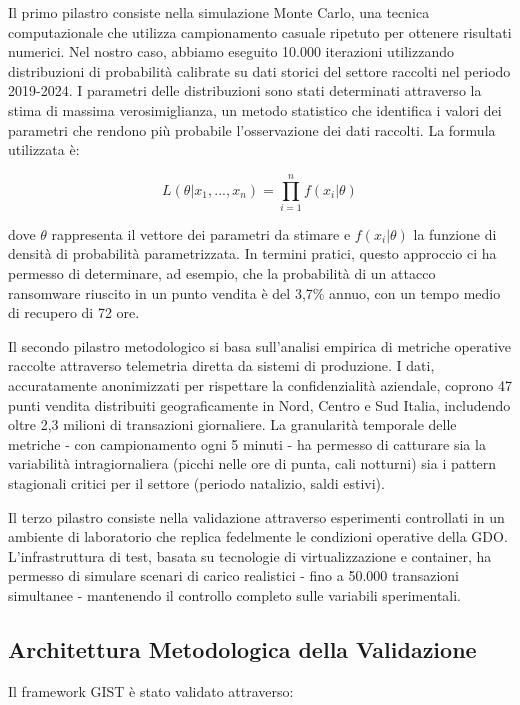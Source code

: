 Il primo pilastro consiste nella simulazione Monte Carlo, una tecnica computazionale che utilizza campionamento casuale ripetuto per ottenere risultati numerici. Nel nostro caso, abbiamo eseguito 10.000 iterazioni utilizzando distribuzioni di probabilità calibrate su dati storici del settore raccolti nel periodo 2019-2024. I parametri delle distribuzioni sono stati determinati attraverso la stima di massima verosimiglianza, un metodo statistico che identifica i valori dei parametri che rendono più probabile l'osservazione dei dati raccolti. La formula utilizzata è:

$$L(\theta|x_1,...,x_n) = \prod_{i=1}^{n} f(x_i|\theta)$$

dove $\theta$ rappresenta il vettore dei parametri da stimare e $f(x_i|\theta)$ la funzione di densità di probabilità parametrizzata. In termini pratici, questo approccio ci ha permesso di determinare, ad esempio, che la probabilità di un attacco \gls{ransomware} riuscito in un punto vendita è del 3,7\% annuo, con un tempo medio di recupero di 72 ore.

Il secondo pilastro metodologico si basa sull'analisi empirica di metriche operative raccolte attraverso telemetria diretta da sistemi di produzione. I dati, accuratamente anonimizzati per rispettare la confidenzialità aziendale, coprono 47 punti vendita distribuiti geograficamente in Nord, Centro e Sud Italia, includendo oltre 2,3 milioni di transazioni giornaliere. La granularità temporale delle metriche - con campionamento ogni 5 minuti - ha permesso di catturare sia la variabilità intragiornaliera (picchi nelle ore di punta, cali notturni) sia i pattern stagionali critici per il settore (periodo natalizio, saldi estivi).

Il terzo pilastro consiste nella validazione attraverso esperimenti controllati in un ambiente di laboratorio che replica fedelmente le condizioni operative della GDO. L'infrastruttura di test, basata su tecnologie di virtualizzazione e \gls{container}, ha permesso di simulare scenari di carico realistici - fino a 50.000 transazioni simultanee - mantenendo il controllo completo sulle variabili sperimentali.

\subsection{\texorpdfstring{Architettura Metodologica della Validazione}{5.2.1 - Architettura Metodologica della Validazione}}

Il framework GIST è stato validato attraverso:

